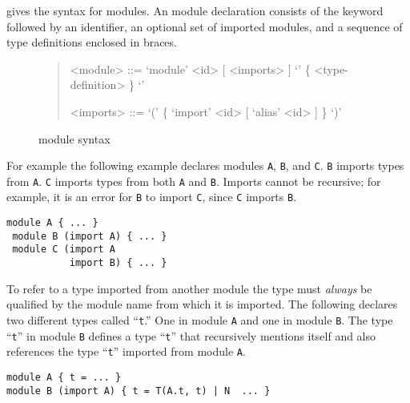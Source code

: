  gives the syntax for modules.
An \asdl{} module declaration consists of the keyword 
followed by an identifier, an optional set of imported modules, and a
sequence of type definitions enclosed in braces.

\begin{figure}[t]
  \begin{quote}
    \begin{grammar}
      <module>  ::=  `module' <id> [ <imports> ] `{' \{ <type-definition> \} `}'

      <imports> ::=  `(' \{ `import' <id> [ `alias' <id> ] \} `)'
    \end{grammar}
  \end{quote}
  \caption{\asdl{} module syntax}
  \label{fig:module-syntax}
\end{figure}%

For example the
following example declares modules \lstinline[language=ASDL]!A!,
\lstinline[language=ASDL]!B!, and \lstinline[language=ASDL]!C!.
\lstinline[language=ASDL]!B! imports types from \lstinline[language=ASDL]!A!.
\lstinline[language=ASDL]!C! imports types from both \lstinline[language=ASDL]!A! and
\lstinline[language=ASDL]!B!.
Imports cannot be recursive; for example, it is an error for \lstinline[language=ASDL]!B! to
import \lstinline[language=ASDL]!C!, since \lstinline[language=ASDL]!C!
imports \lstinline[language=ASDL]!B!.
\begin{code}\begin{lstlisting}[language=ASDL]
 module A { ... }
 module B (import A) { ... }
 module C (import A
           import B) { ... }
\end{lstlisting}\end{code}%

To refer to a type imported from another module the type must
\emph{always} be qualified by the module name from which it is
imported.
The following declares two different types called ``\texttt{t}.''
One in module \texttt{A} and one in module \texttt{B}.
The type ``\texttt{t}'' in module \texttt{B} defines a type ``\texttt{t}'' that
recursively mentions itself and also references the type ``\texttt{t}'' imported
from module \texttt{A}.
\begin{code}\begin{lstlisting}[language=ASDL]
module A { t = ... }
module B (import A) { t = T(A.t, t) | N  ... }
\end{lstlisting}\end{code}%

